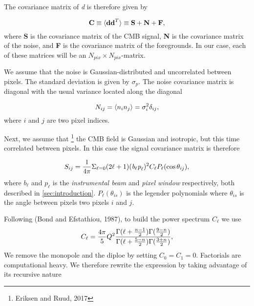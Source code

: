 \documentclass{emulateapj}
\begin{document}
  The covariance matrix of \textit{d} is therefore given by

\begin{equation}
\textbf{C} \equiv \braket{\textbf{d}\textbf{d}^T} \equiv \textbf{S} + \textbf{N} + \textbf{F},\\[10pt]
\end{equation}
where \textbf{S} is the covariance matrix of the CMB signal, \textbf{N} is the covariance matrix of the noise, and \textbf{F} is the covariance matrix of the foregrounds. In our case, each of these matrices will be an $N_{pix}\times N_{pix}$-matrix.

  We assume that the noise is Gaussian-distributed and uncorrelated between pixels. The standard deviation is given by $\sigma_p$. The noise covariance matrix is diagonal with the usual variance located along the diagonal

\begin{equation}
N_{ij} = \braket{n_in_j} = \sigma_i^2\delta_{ij},\\[10pt]
\end{equation}
where $i$ and $j$ are two pixel indices.

  Next, we assume that \footnote{Eriksen and Ruud, 2017} the CMB field is Gaussian and isotropic, but this time correlated between pixels. In this case the signal covariance matrix is therefore

\begin{equation}
S_{ij} = \frac{1}{4\pi}\Sigma_{\ell=0}(2\ell + 1)(\textit{b}_\ell\textit{p}_\ell)^2 C_\ell P_\ell(\cos{\theta_{ij}}),\\[10pt]
\end{equation}
where $b_\ell$ and $p_{\ell}$ is the \textit{instrumental beam} and \textit{pixel window} respectively, both described in \ref{sec:introduction}. $P_\ell(\theta_{is})$ is the legender polynomials where $\theta_{is}$ is the angle between pixels two pixels $i$ and $j$.

  Following (Bond and Efstathiou, 1987), to build the power spectrum $C_\ell$ we use
\begin{equation}
C_\ell = \frac{4\pi}{5}Q^2\frac{\Gamma{(\ell + \frac{n - 1}{2})}\Gamma{(\frac{9-n}{2})}}{\Gamma{(\ell + \frac{5-n}{2})}\Gamma{(\frac{3+n}{2})}},\\[10pt]
\end{equation}
We remove the monopole and the diploe by setting $C_0 = C_1 = 0$. Factorials are computational heavy. We therefore rewrite the expression by taking advantage of its recursive nature 
\end{document}
